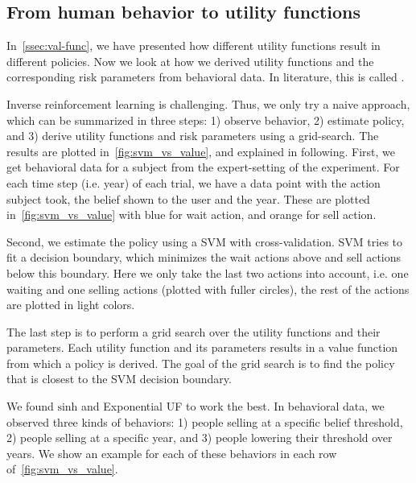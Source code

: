 \subsection{From human behavior to utility functions}\label{ssec:human-behavior}

In~\autoref{ssec:val-func}, we have presented how different utility functions result in different policies.
Now we look at how we derived utility functions and the corresponding risk parameters from behavioral data.
In literature, this is called  \cite{Abbeel2010}.

Inverse reinforcement learning is challenging. Thus, we only try a naive approach, which can be summarized in three steps: 1) observe behavior, 2) estimate policy, and 3) derive utility functions and risk parameters using a grid-search.
The results are plotted in~\autoref{fig:svm_vs_value}, and explained in following. 
First, we get behavioral data for a subject from the expert-setting of the experiment.
For each time step (i.e. year) of each trial, we have a data point with the action subject took, the belief shown to the user and the year. These are plotted in~\autoref{fig:svm_vs_value} with blue for wait action, and orange for sell action.

Second, we estimate the policy using a SVM \cite{svm} with cross-validation. SVM tries to fit a decision boundary, which minimizes the wait actions above and sell actions below this boundary. Here we only take the last two actions into account, i.e. one waiting and one selling actions (plotted with fuller circles), the rest of the actions are plotted in light colors.

The last step is to perform a grid search over the utility functions and their parameters.
Each utility function and its parameters results in a value function from which a policy is derived.
The goal of the grid search is to find the policy that is closest to the SVM decision boundary.

We found $\text{sinh}$ and Exponential UF to work the best. In behavioral data, we observed three kinds of behaviors: 1) people selling at a specific belief threshold, 2) people selling at a specific year, and 3) people lowering their threshold over years. We show an example for each of these behaviors in each row of~\autoref{fig:svm_vs_value}.


